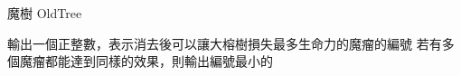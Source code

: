 \begin{problem}{魔樹 OldTree}
\OutputFile

輸出一個正整數，表示消去後可以讓大榕樹損失最多生命力的魔瘤的編號 \newline
若有多個魔瘤都能達到同樣的效果，則輸出編號最小的 \newline

\Examples

\begin{example}
%
%
\end{example}

\end{problem}

